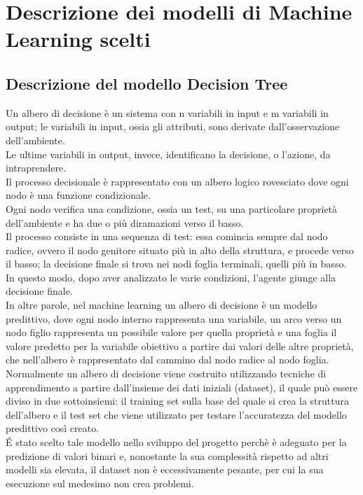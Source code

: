 \section{Descrizione dei modelli di Machine Learning scelti} 
\subsection{Descrizione del modello Decision Tree}

Un albero di decisione è un sistema con n variabili in input e m variabili in output; le variabili in input, ossia gli attributi, sono derivate 
dall'osservazione dell'ambiente. \\
Le ultime variabili in output, invece, identificano la decisione, o l'azione, da intraprendere.\\
Il processo decisionale è rappresentato con un albero logico rovesciato dove ogni nodo è una funzione condizionale.\\
Ogni nodo verifica una condizione, ossia un test, su una particolare proprietà dell'ambiente e ha due o più diramazioni verso il basso. \\
Il processo consiste in una sequenza di test: essa comincia sempre dal nodo radice, ovvero il nodo genitore situato più in alto della struttura, 
e procede verso il basso; la decisione finale si trova nei nodi foglia terminali, quelli più in basso. \\
In questo modo, dopo aver analizzato le varie condizioni, l'agente giunge alla decisione finale.\\
In altre parole, nel machine learning un albero di decisione è un modello predittivo, dove ogni nodo interno rappresenta una variabile, un arco verso un nodo figlio rappresenta un possibile valore per quella proprietà e una foglia il valore predetto per la variabile obiettivo a partire dai valori delle altre proprietà, 
che nell'albero è rappresentato dal cammino dal nodo radice al nodo foglia. \\
Normalmente un albero di decisione viene costruito utilizzando tecniche di apprendimento a partire dall'insieme dei dati iniziali (dataset), il quale può essere diviso in due sottoinsiemi: il training set sulla base del quale si crea la struttura dell'albero e il test set che viene utilizzato per testare l'accuratezza del modello predittivo così creato.\\
\'E stato scelto tale modello nello sviluppo del progetto perchè è adeguato per la predizione di valori binari e, nonostante la sua complessità rispetto ad altri modelli sia elevata, il dataset non è eccessivamente pesante, per cui la sua esecuzione sul medesimo non crea problemi.

